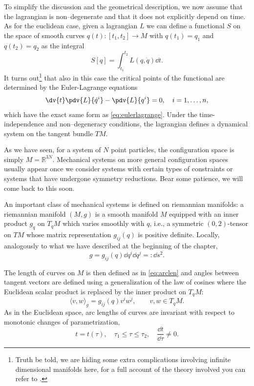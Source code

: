 \documentclass[english,fontsize=11pt,paper=b5]{scrbook}
\theoremstyle{definition}
\begin{document}
    To simplify the discussion and the geometrical description, we now assume that the lagrangian is non--degenerate and that it does not explicitly depend on time.
    As for the euclidean case, given a lagrangian $L$ we can define a functional $S$ on the space of smooth curves $q(t): [t_1,t_2] \to M$ with $q(t_1) = q_1$ and $q(t_2) = q_2$ as the integral
    \begin{equation}
      S[q] = \int_{t_1}^{t_2} L(q,\dot q) \dd t.
    \end{equation}
    It turns out\footnote{Truth be told, we are hiding some extra complications involving infinite dimensional manifolds here, for a full account of the theory involved you can refer to \cite[Chapters 7 and 8]{book:marsdenratiu}.} that also in this case the critical points of the functional are determined by the Euler-Lagrange equations
    \begin{equation}
      \dv{t}\pdv{L}{\dot q^i} - \pdv{L}{q^i} =0, \quad i=1,\ldots,n,
    \end{equation}
    which have the exact same form as \eqref{eq:eulerlagrange}.
    Under the time-independence and non--degeneracy conditions, the lagrangian defines a dynamical system on the tangent bundle $TM$.

    As we have seen, for a system of $N$ point particles, the configuration space is simply $M=\mathbb{R}^{3N}$. Mechanical systems on more general configuration spaces usually appear once we consider systems with certain types of constraints or systems that have undergone symmetry reductions.
    Bear some patience, we will come back to this soon.
    \medskip

    An important class of mechanical systems is defined on riemannian manifolds: a riemannian manifold $(M, g)$ is a smooth manifold $M$ equipped with an inner product $g_q$ on $T_q M$ which varies smoothly with $q$, i.e., a symmetric $(0,2)$-tensor on $TM$ whose matrix representation $g_{ij}(q)$ is positive definite.
    Locally, analogously to what we have described at the beginning of the chapter,
    \begin{equation}
      g = g_{ij}(q) \dd q^i \dd q^j =: \dd s^2.
    \end{equation}

    The length of curves on $M$ is then defined as in \eqref{eq:arclen} and angles between tangent vectors are defined using a generalization of the law of cosines where the Euclidean scalar product is replaced by the inner product on $T_qM$:
    \begin{equation}
      \langle v, w\rangle_g = g_{ij}(q) v^i w^j, \qquad v,w\in T_q M.
    \end{equation}
    As in the Euclidean space, arc lengths of curves are invariant with respect to monotonic changes of parametrization,
    \begin{equation}
      t = t(\tau),\quad \tau_1\leq \tau\leq \tau_2, \quad \frac{\dd t}{\dd \tau}\neq 0.
    \end{equation}
\end{document}
